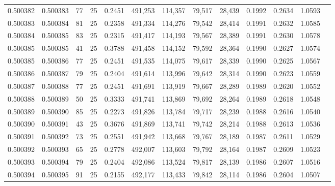 \begin{tabular}{rrrrrrrrrrrrr}
0.500382 & 0.500383 &  77 &  25 &                                     0.2451 & 491,253 & 114,357 &  79,517 &  28,439 & 0.1992 & 0.2634 & 1.0593 \\
0.500383 & 0.500384 &  81 &  25 &                                     0.2358 & 491,334 & 114,276 &  79,542 &  28,414 & 0.1991 & 0.2632 & 1.0585 \\
0.500384 & 0.500385 &  83 &  25 &                                     0.2315 & 491,417 & 114,193 &  79,567 &  28,389 & 0.1991 & 0.2630 & 1.0578 \\
0.500385 & 0.500385 &  41 &  25 &                                     0.3788 & 491,458 & 114,152 &  79,592 &  28,364 & 0.1990 & 0.2627 & 1.0574 \\
0.500385 & 0.500386 &  77 &  25 &                                     0.2451 & 491,535 & 114,075 &  79,617 &  28,339 & 0.1990 & 0.2625 & 1.0567 \\
0.500386 & 0.500387 &  79 &  25 &                                     0.2404 & 491,614 & 113,996 &  79,642 &  28,314 & 0.1990 & 0.2623 & 1.0559 \\
0.500387 & 0.500388 &  77 &  25 &                                     0.2451 & 491,691 & 113,919 &  79,667 &  28,289 & 0.1989 & 0.2620 & 1.0552 \\
0.500388 & 0.500389 &  50 &  25 &                                     0.3333 & 491,741 & 113,869 &  79,692 &  28,264 & 0.1989 & 0.2618 & 1.0548 \\
0.500389 & 0.500390 &  85 &  25 &                                     0.2273 & 491,826 & 113,784 &  79,717 &  28,239 & 0.1988 & 0.2616 & 1.0540 \\
0.500390 & 0.500391 &  43 &  25 &                                     0.3676 & 491,869 & 113,741 &  79,742 &  28,214 & 0.1988 & 0.2613 & 1.0536 \\
0.500391 & 0.500392 &  73 &  25 &                                     0.2551 & 491,942 & 113,668 &  79,767 &  28,189 & 0.1987 & 0.2611 & 1.0529 \\
0.500392 & 0.500393 &  65 &  25 &                                     0.2778 & 492,007 & 113,603 &  79,792 &  28,164 & 0.1987 & 0.2609 & 1.0523 \\
0.500393 & 0.500394 &  79 &  25 &                                     0.2404 & 492,086 & 113,524 &  79,817 &  28,139 & 0.1986 & 0.2607 & 1.0516 \\
0.500394 & 0.500395 &  91 &  25 &                                     0.2155 & 492,177 & 113,433 &  79,842 &  28,114 & 0.1986 & 0.2604 & 1.0507 \\

\end{tabular}

